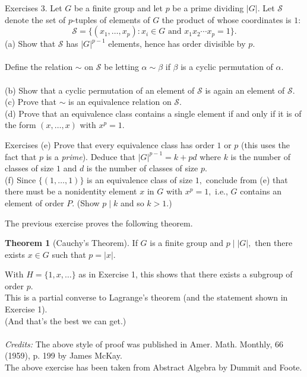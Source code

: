 \documentclass[handout, dvipsnames]{beamer}
\theoremstyle{definition}
\newtheorem{thm}{Theorem}
\begin{document}
\begin{frame}{Exercises}
    3. Let $G$ be a finite group and let $p$ be a prime dividing $|G|.$ Let $\mathcal{S}$ denote the set of $p$-tuples of elements of $G$ the product of whose coordinates is $1:$
    \begin{equation*} 
        \mathcal{S} = \{(x_1, \ldots, x_p) : x_i \in G \text{ and } x_1x_2\cdots x_p = 1\}.
    \end{equation*}
        (a) Show that $\mathcal{S}$ has $|G|^{p-1}$ elements, hence has order divisible by $p.$\\~\\
        Define the relation $\sim$ on $\mathcal{S}$ be letting $\alpha \sim \beta$ if $\beta$ is a cyclic permutation of $\alpha.$\\~\\
        (b) Show that a cyclic permutation of an element of $\mathcal{S}$ is again an element of $\mathcal{S}.$ \\
        (c) Prove that $\sim$ is an equivalence relation on $\mathcal{S}.$\\
        (d) Prove that an equivalence class contains a single element if and only if it is of the form $(x, \ldots, x)$ with $x^p = 1.$\\
\end{frame}
\begin{frame}{Exercises}
        (e) Prove that every equivalence class has order $1$ or $p$ (this uses the fact that $p$ is a \emph{prime}). Deduce that $|G|^{p-1} = k + pd$ where $k$ is the number of classes of size $1$ and $d$ is the number of classes of size $p.$\\
        (f) Since $\{(1, \ldots, 1)\}$ is an equivalence class of size $1,$ conclude from (e) that there must be a nonidentity element $x$ in $G$ with $x^p = 1,$ i.e., $G$ contains an element of order $P.$ (Show $p \mid k$ and so $k > 1.$)
\end{frame}
\begin{frame}{}
    The previous exercise proves the following theorem.
    \begin{thm}[Cauchy's Theorem]
        If $G$ is a finite group and $p \mid |G|,$ then there exists $x \in G$ such that $p = |x|.$
    \end{thm}
    With $H = \{1, x, \ldots\}$ as in Exercise 1, this shows that there exists a subgroup of order $p.$ \\
    This is a partial converse to Lagrange's theorem (and the statement shown in Exercise 1). \\
    (And that's the best we can get.) \\~\\
    \emph{Credits:} The above style of proof was published in Amer. Math. Monthly, 66 (1959), p. 199 by James McKay.\\
    The above exercise has been taken from Abstract Algebra by Dummit and Foote.
\end{frame}
\end{document}

